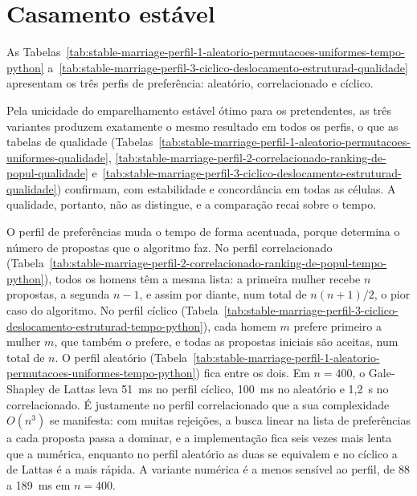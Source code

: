\section{Casamento estável}
\label{sec:res_stable}

As Tabelas~\ref{tab:stable-marriage-perfil-1-aleatorio-permutacoes-uniformes-tempo-python}
a~\ref{tab:stable-marriage-perfil-3-ciclico-deslocamento-estruturad-qualidade}
apresentam os três perfis de preferência: aleatório, correlacionado e cíclico.








Pela unicidade do emparelhamento estável ótimo para os pretendentes, as três
variantes produzem exatamente o mesmo resultado em todos os perfis, o que as
tabelas de qualidade
(Tabelas~\ref{tab:stable-marriage-perfil-1-aleatorio-permutacoes-uniformes-qualidade},
\ref{tab:stable-marriage-perfil-2-correlacionado-ranking-de-popul-qualidade}
e~\ref{tab:stable-marriage-perfil-3-ciclico-deslocamento-estruturad-qualidade})
confirmam, com estabilidade e concordância em todas as células. A qualidade,
portanto, não as distingue, e a comparação recai sobre o tempo.

O perfil de preferências muda o tempo de forma acentuada, porque determina o número
de propostas que o algoritmo faz. No perfil correlacionado
(Tabela~\ref{tab:stable-marriage-perfil-2-correlacionado-ranking-de-popul-tempo-python}),
todos os homens têm a mesma lista: a primeira mulher recebe $n$ propostas, a
segunda $n - 1$, e assim por diante, num total de $n(n+1)/2$, o pior caso do
algoritmo. No perfil cíclico
(Tabela~\ref{tab:stable-marriage-perfil-3-ciclico-deslocamento-estruturad-tempo-python}),
cada homem $m$ prefere primeiro a mulher $m$, que também o prefere, e todas as
propostas iniciais são aceitas, num total de $n$. O perfil aleatório
(Tabela~\ref{tab:stable-marriage-perfil-1-aleatorio-permutacoes-uniformes-tempo-python})
fica entre os dois. Em $n = 400$, o Gale-Shapley de Lattas leva 51~ms no perfil
cíclico, 100~ms no aleatório e 1{,}2~s no correlacionado. É justamente no perfil
correlacionado que a sua complexidade $O(n^3)$ se manifesta: com muitas rejeições,
a busca linear na lista de preferências a cada proposta passa a dominar, e a
implementação fica seis vezes mais lenta que a numérica, enquanto no perfil
aleatório as duas se equivalem e no cíclico a de Lattas é a mais rápida. A variante numérica é a menos sensível ao perfil, de
88 a 189~ms em $n = 400$.

